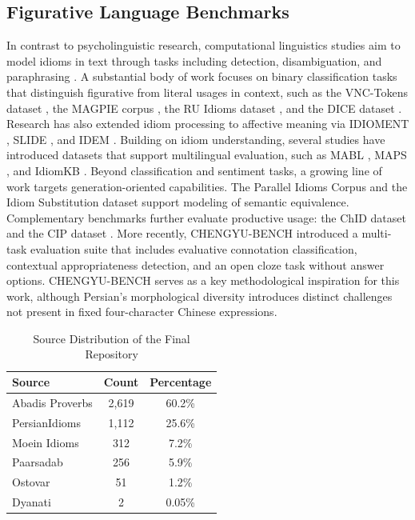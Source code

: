 \documentclass[11pt,a4paper]{article}
\begin{document}
\subsection{Figurative Language Benchmarks}
In contrast to psycholinguistic research, computational linguistics studies aim to model idioms in text through tasks including detection, disambiguation, and paraphrasing \cite{flor2025idiomsurvey}. A substantial body of work focuses on binary classification tasks that distinguish figurative from literal usages in context, such as the VNC-Tokens dataset \cite{fazly2009idiomidentification}, the MAGPIE corpus \cite{haagsma2020magpie}, the RU Idioms dataset \cite{aharodnik2018russianidiom}, and the DICE dataset \cite{mi2025rollingdice}. Research has also extended idiom processing to affective meaning via IDIOMENT \cite{williams2015idiomsentiment}, SLIDE \cite{jochim2018slide}, and IDEM \cite{prochnow2024idem}. Building on idiom understanding, several studies have introduced datasets that support multilingual evaluation, such as MABL \cite{kabra2023multicultural}, MAPS \cite{liu2023culturalproverbs}, and IdiomKB \cite{li2024idiomkb}. Beyond classification and sentiment tasks, a growing line of work targets generation-oriented capabilities. The Parallel Idioms Corpus \cite{zhou2021pie} and the Idiom Substitution dataset \cite{liu2016phrasalsub} support modeling of semantic equivalence. Complementary benchmarks further evaluate productive usage: the ChID dataset \cite{zheng2019chid} and the CIP dataset \cite{qiang2023idiomparaphrase}. More recently, CHENGYU-BENCH \cite{fu2025chengyubench} introduced a multi-task evaluation suite that includes evaluative connotation classification, contextual appropriateness detection, and an open cloze task without answer options. CHENGYU-BENCH serves as a key methodological inspiration for this work, although Persian's morphological diversity introduces distinct challenges not present in fixed four-character Chinese expressions.

\begin{table}[t]
\centering
\caption{Source Distribution of the Final Repository}
\label{tab:source_distribution}
\begin{tabular}{lcc}
\toprule
\textbf{Source} & \textbf{Count} & \textbf{Percentage} \\
\midrule
Abadis Proverbs & 2,619 & 60.2\% \\
PersianIdioms & 1,112 & 25.6\% \\
Moein Idioms & 312 & 7.2\% \\
Paarsadab & 256 & 5.9\% \\
Ostovar & 51 & 1.2\% \\
Dyanati & 2 & 0.05\% \\
\bottomrule
\end{tabular}
\end{table}
\end{document}
